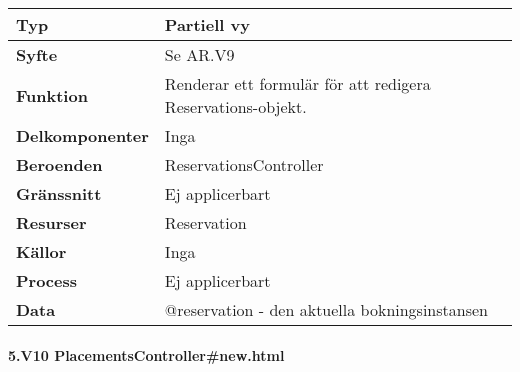 \documentclass[a4paper, twoside, 11pt, titlepage]{article}
\begin{document}
			\begin {table} [ht] \begin{tabular} {  p{3.5cm} p{11.6cm} }
				\hline
				{\sffamily\textbf{Typ}} & {Partiell vy} \\
				\hline
				{\sffamily\textbf{Syfte}} & {Se AR.V9} \\
				\hline
				{\sffamily\textbf{Funktion}} & {Renderar ett formulär för att redigera Reservations-objekt.} \\
				\hline
				{\sffamily\textbf{Delkomponenter}} & {Inga} \\
				\hline
				{\sffamily\textbf{Beroenden}} & {ReservationsController} \\
				\hline
				{\sffamily\textbf{Gränssnitt}} & {Ej applicerbart} \\
				\hline
				{\sffamily\textbf{Resurser}} & {Reservation} \\
				\hline
				{\sffamily\textbf{Källor}} & {Inga} \\
				\hline
				{\sffamily\textbf{Process}} & {Ej applicerbart} \\
				\hline
				{\sffamily\textbf{Data}} & {@reservation - den aktuella bokningsinstansen} \\
				\hline
			\end{tabular} \end{table} \FloatBarrier


			\clearpage %
			\paragraph{5.V10 PlacementsController\#new.html}\
\end{document}
